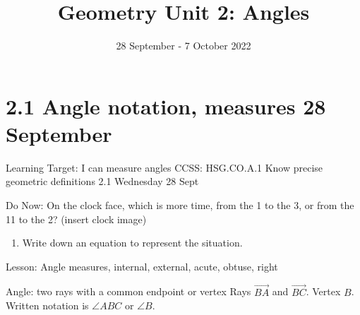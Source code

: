 

\title{Geometry Unit 2: Angles}
\date{28 September - 7 October 2022}


\frame{\titlepage}

\section[Outline]{}
\frame{\tableofcontents}

\section{2.1 Angle notation, measures \hfill 28 September}
\begin{frame}{Learning Target: I can measure angles}
  {CCSS: HSG.CO.A.1 Know precise geometric definitions \hfill \alert{2.1 Wednesday 28 Sept}}
  \begin{block}{Do Now: On the clock face, which is more time, from the 1 to the 3, or from the 11 to the 2? (insert clock image)}
  \begin{enumerate}
    \item Write down an equation to represent the situation.
  \end{enumerate}
  \end{block}
  Lesson: Angle measures, internal, external, acute, obtuse, right
\end{frame}

\begin{frame}{Angle: two rays with a common endpoint or vertex}
  Rays $\overrightarrow{BA}$ and $\overrightarrow{BC}$. Vertex $B$.
  Written notation is $\angle ABC$ or $\angle B$. \\[0.75cm]
        \begin{center}
          \end{center}
    \end{frame}

